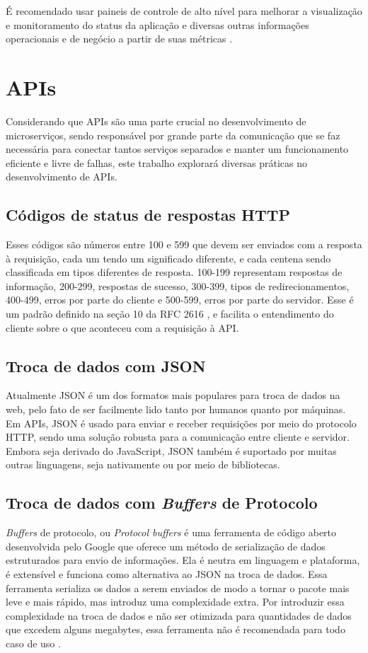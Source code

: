 É recomendado usar paineis de controle de alto nível para melhorar a visualização e monitoramento do status da aplicação e diversas outras informações operacionais e de negócio a partir de suas métricas \cite{martin-fowler-microservices}.

\section{APIs}\label{boas-praticas-apis}

Considerando que APIs são uma parte crucial no desenvolvimento de microserviços, sendo responsável por grande parte da comunicação que se faz necessária para conectar tantos serviços separados e manter um funcionamento eficiente e livre de falhas, este trabalho explorará diversas práticas no desenvolvimento de APIs.

\subsection{Códigos de status de respostas HTTP}
Esses códigos são números entre 100 e 599 que devem ser enviados com a resposta à requisição, cada um tendo um significado diferente, e cada centena sendo classificada em tipos diferentes de resposta. 100-199 representam respostas de informação, 200-299, respostas de sucesso, 300-399, tipos de redirecionamentos, 400-499, erros por parte do cliente e 500-599, erros por parte do servidor. Esse é um padrão definido na seção 10 da RFC 2616 \cite{rfc_http_nielsen_1999}, e facilita o entendimento do cliente sobre o que aconteceu com a requisição à API.

\subsection{Troca de dados com JSON}
Atualmente JSON é um dos formatos mais populares para troca de dados na web, pelo fato de ser facilmente lido tanto por humanos quanto por máquinas. Em APIs, JSON é usado para enviar e receber requisições por meio do protocolo HTTP, sendo uma solução robusta para a comunicação entre cliente e servidor. Embora seja derivado do JavaScript, JSON também é suportado por muitas outras linguagens, seja nativamente ou por meio de bibliotecas.  \cite{json_bourhis_2020}

\subsection{Troca de dados com \emph{Buffers} de Protocolo}\label{subsessao-protocol-buffers}
\emph{Buffers} de protocolo, ou \emph{Protocol buffers} é uma ferramenta de código aberto desenvolvida pelo Google que oferece um método de serialização de dados estruturados para envio de informações. Ela é neutra em linguagem e plataforma, é extensível e funciona como alternativa ao JSON na troca de dados. Essa ferramenta serializa os dados a serem enviados de modo a tornar o pacote mais leve e mais rápido, mas introduz uma complexidade extra. Por introduzir essa complexidade na troca de dados e não ser otimizada para quantidades de dados que excedem alguns megabytes, essa ferramenta não é recomendada para todo caso de uso \cite{google-protocol-buffers}.

